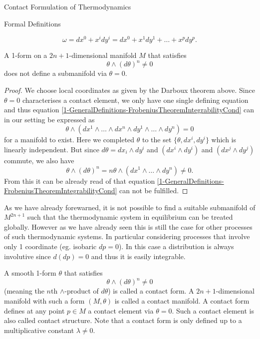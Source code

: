 \begin{section}{Contact Formulation of Thermodynamics}
\begin{subsection}{Formal Definitions}
\begin{theorem}
\begin{equation}
		\omega = dx^0 + x^i dy^i = dx^0 + x^1dy^1+\dots+x^pdy^p.
	\end{equation}
\end{theorem}
\begin{lemma}
	A 1-form on a $2n+1$-dimensional manifold $M$ that satisfies
	\begin{equation}
		\theta\wedge(d\theta)^n\neq0
	\end{equation}
	does not define a submanifold via $\theta=0$.
\end{lemma}
\begin{proof}
	We choose local coordinates as given by the Darboux theorem above. Since $\theta=0$ characterises a contact element, we only have one single defining equation and thus equation \ref{1-GeneralDefinitions-FrobeniusTheoremIntegrabilityCond} can in our setting be expressed as
	\begin{equation}
		\theta\wedge(dx^1\wedge\dots\wedge dx^n\wedge dy^1\wedge\dots\wedge dy^n) = 0
	\end{equation}
	for a manifold to exist. Here we completed $\theta$ to the set $\{\theta,dx^i,dy^i\}$ which is linearly independent. But since $d\theta=dx_i\wedge dy^i$ and $(dx^i\wedge dy^i)$ and $(dx^j\wedge dy^j)$ commute, we also have
	\begin{equation}
		\theta\wedge(d\theta)^n=n\theta\wedge(dx^1\wedge\dots\wedge dy^n)\neq0.
	\end{equation}
	From this it can be already read of that equation \ref{1-GeneralDefinitions-FrobeniusTheoremIntegrabilityCond} can not be fulfilled.
\end{proof}
\begin{remark}
	As we have already forewarned, it is not possible to find a suitable submanifold of $M^{2n+1}$ such that the thermodynamic system in equilibrium can be treated globally. However as we have already seen this is still the case for other processes of such thermodynamic systems. In particular considering processes that involve only 1 coordinate (eg. isobaric $dp=0$). In this case a distribution is always involutive since $d(dp)=0$ and thus it is easily integrable.
\end{remark}
%
%
%
\begin{definition}
	A smooth 1-form $\theta$ that satisfies
	\begin{equation}
		\theta\wedge(d\theta)^n\neq0
	\end{equation}
	(meaning the $n$th $\wedge$-product of $d\theta$) is called a contact form. A $2n+1$-dimensional manifold with such a form $(M,\theta)$ is called a contact manifold. A contact form defines at any point $p\in M$ a contact element via $\theta=0$. Such a contact element is also called contact structure. Note that a contact form is only defined up to a multiplicative constant $\lambda\neq0$.

\end{definition}
\end{subsection}
\end{section}
